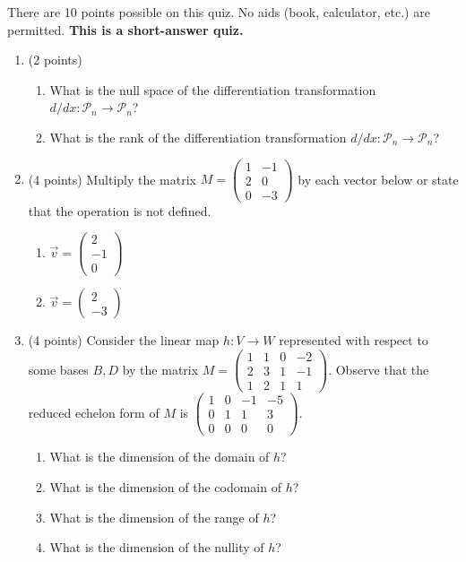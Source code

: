 \documentclass[12pt]{article}
\def\bpm{\begin{pmatrix}}
\def\epm{\end{pmatrix}}
\begin{document}

There are 10 points possible on this quiz. No aids (book, calculator, etc.)
are permitted.  {\bf This is a short-answer quiz.}

\begin{enumerate}
\item (2 points) 
	\begin{enumerate}
	\item What is the null space of the differentiation transformation $d/dx: \mathcal{P}_n \to \mathcal{P}_n$?\\
	\vspace{1in}
	\item What is the rank of the differentiation transformation $d/dx: \mathcal{P}_n \to \mathcal{P}_n$?\\
	\vspace{1in}
	\end{enumerate} 
\item (4 points) Multiply the matrix $M=\bpm 1&-1 \\ 2&0 \\ 0& -3 \epm$ by each vector below or state that the operation is not defined.
	\begin{enumerate}
	\item $\vec{v}=\bpm 2\\ -1\\0 \epm$ \\
	\vspace{1in}
	\item $\vec{v}=\bpm 2 \\ -3 \epm$ \\
	\vspace{1in}
	\end{enumerate}
\newpage
\item (4 points) Consider the linear map $h: V \to W$ represented with respect to some bases $B, D$ by the matrix $M=\bpm 1&1&0&-2 \\ 2&3&1&-1 \\ 1&2&1&1\epm.$ Observe that the reduced echelon form of $M$ is $\bpm 1&0&-1&-5\\0&1&1&3\\0&0&0&0\epm .$
	\begin{enumerate}
	\item What is the dimension of the domain of $h$?\\
	\vspace{1in}
	
	\item What is the dimension of the codomain of $h$?\\
	\vspace{1in}
	
	\item What is the dimension of the range of $h$?\\
	\vspace{1in}
	
	\item What is the dimension of the nullity of $h$?\\
	
	\end{enumerate}
\end{enumerate}	
\end{document}
